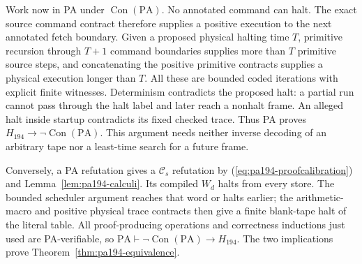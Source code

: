 Work now in PA under $\operatorname{Con}(\mathrm{PA})$.
No annotated command can halt. The exact source command contract
therefore supplies a positive execution to the next annotated fetch
boundary. Given a proposed physical halting time $T$, primitive
recursion through $T+1$ command boundaries supplies more than $T$
primitive source steps, and concatenating the positive primitive
contracts supplies a physical execution longer than $T$.
All these are bounded coded iterations with explicit finite
witnesses. Determinism contradicts the proposed halt: a partial run
cannot pass through the halt label and later reach a nonhalt frame.
An alleged halt inside startup contradicts its fixed checked trace.
Thus PA proves $H_{194}\to\neg\operatorname{Con}(\mathrm{PA})$.
This argument needs neither inverse decoding of an arbitrary tape
nor a least-time search for a future frame.

Conversely, a PA refutation gives a $\mathcal C_s$ refutation by
(\ref{eq:pa194-proofcalibration}) and Lemma~\ref{lem:pa194-calculi}.
Its compiled $W_d$ halts from every store. The bounded scheduler
argument reaches that word or halts earlier; the arithmetic-macro
and positive physical trace contracts then give a finite blank-tape
halt of the literal table. All proof-producing operations and
correctness inductions just used are PA-verifiable, so
$\mathrm{PA}\vdash\neg\operatorname{Con}(\mathrm{PA})\to H_{194}$.
The two implications prove Theorem~\ref{thm:pa194-equivalence}.
